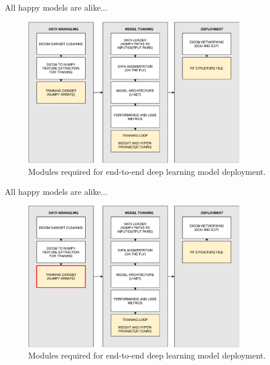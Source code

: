 \documentclass[9pt]{beamer}
\begin{document}
\begin{frame}{All happy models are alike...}
\begin{figure}
\includegraphics[width=0.85\textwidth]{images/modules_blank}
\caption{Modules required for end-to-end deep learning model deployment.}
\end{figure}
\end{frame}

\begin{frame}{All happy models are alike...}
  \begin{figure}
    \includegraphics[width=0.85\textwidth]{images/modules_data}
    \caption{Modules required for end-to-end deep learning model deployment.}
  \end{figure}
\end{frame}
\end{document}
